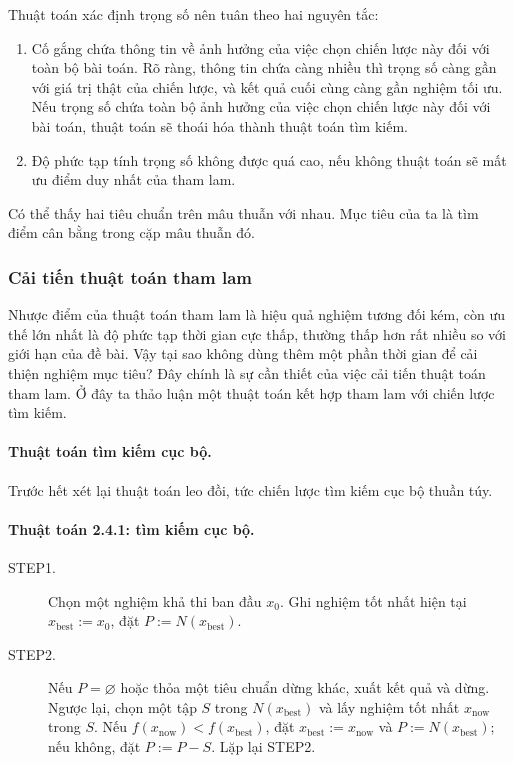 \documentclass[11pt]{article}
\begin{document}
Thuật toán xác định trọng số nên tuân theo hai nguyên tắc:
\begin{enumerate}
  \item Cố gắng chứa thông tin về ảnh hưởng của việc chọn chiến lược này đối
  với toàn bộ bài toán. Rõ ràng, thông tin chứa càng nhiều thì trọng số càng
  gần với giá trị thật của chiến lược, và kết quả cuối cùng càng gần nghiệm
  tối ưu. Nếu trọng số chứa toàn bộ ảnh hưởng của việc chọn chiến lược này đối
  với bài toán, thuật toán sẽ thoái hóa thành thuật toán tìm kiếm.
  \item Độ phức tạp tính trọng số không được quá cao, nếu không thuật toán sẽ
  mất ưu điểm duy nhất của tham lam.
\end{enumerate}

Có thể thấy hai tiêu chuẩn trên mâu thuẫn với nhau. Mục tiêu của ta là tìm
điểm cân bằng trong cặp mâu thuẫn đó.

\subsubsection{Cải tiến thuật toán tham lam}

Nhược điểm của thuật toán tham lam là hiệu quả nghiệm tương đối kém, còn ưu
thế lớn nhất là độ phức tạp thời gian cực thấp, thường thấp hơn rất nhiều so
với giới hạn của đề bài. Vậy tại sao không dùng thêm một phần thời gian để cải
thiện nghiệm mục tiêu? Đây chính là sự cần thiết của việc cải tiến thuật toán
tham lam. Ở đây ta thảo luận một thuật toán kết hợp tham lam với chiến lược
tìm kiếm.

\paragraph{Thuật toán tìm kiếm cục bộ.}
Trước hết xét lại thuật toán leo đồi, tức chiến lược tìm kiếm cục bộ thuần
túy.

\paragraph{Thuật toán 2.4.1: tìm kiếm cục bộ.}
\begin{description}
  \item[STEP1.] Chọn một nghiệm khả thi ban đầu \(x_0\). Ghi nghiệm tốt nhất
  hiện tại \(x_{\mathrm{best}}:=x_0\), đặt \(P:=N(x_{\mathrm{best}})\).
  \item[STEP2.] Nếu \(P=\varnothing\) hoặc thỏa một tiêu chuẩn dừng khác, xuất
  kết quả và dừng. Ngược lại, chọn một tập \(S\) trong \(N(x_{\mathrm{best}})\)
  và lấy nghiệm tốt nhất \(x_{\mathrm{now}}\) trong \(S\). Nếu
  \(f(x_{\mathrm{now}})<f(x_{\mathrm{best}})\), đặt
  \(x_{\mathrm{best}}:=x_{\mathrm{now}}\) và
  \(P:=N(x_{\mathrm{best}})\); nếu không, đặt \(P:=P-S\). Lặp lại STEP2.
\end{description}
\end{document}
